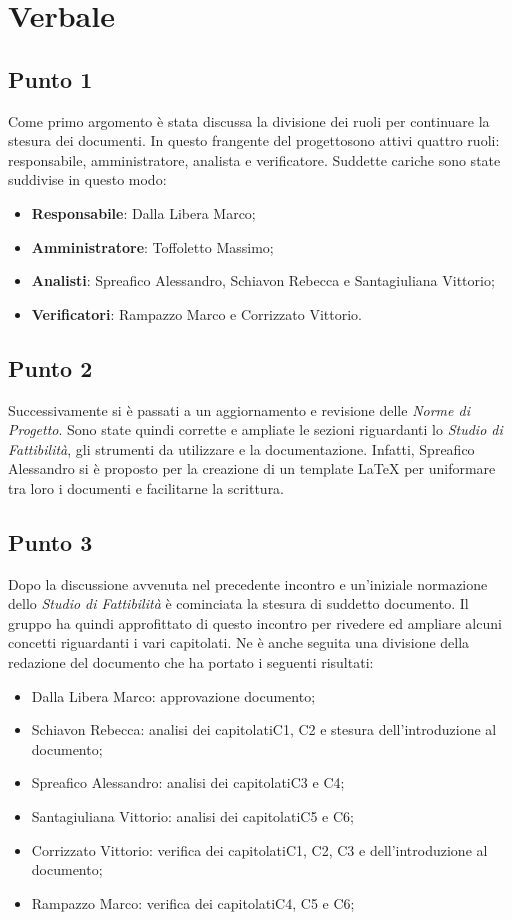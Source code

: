 \section{Verbale}
    \subsection{Punto 1}
        Come primo argomento è stata discussa la divisione dei ruoli per continuare la stesura dei documenti. In questo frangente del progetto\glosp sono attivi quattro ruoli: responsabile, amministratore, analista e verificatore. Suddette cariche sono state suddivise in questo modo:
        \begin{itemize}
            \item \textbf{Responsabile}: Dalla Libera Marco;
            \item \textbf{Amministratore}: Toffoletto Massimo;
            \item \textbf{Analisti}: Spreafico Alessandro, Schiavon Rebecca e Santagiuliana Vittorio;
            \item \textbf{Verificatori}: Rampazzo Marco e Corrizzato Vittorio. 
        \end{itemize}
    \subsection{Punto 2}
        Successivamente si è passati a un aggiornamento e revisione delle \textit{Norme di Progetto}. Sono state quindi corrette e ampliate le sezioni riguardanti lo \textit{Studio di Fattibilità}, gli strumenti da utilizzare e la documentazione. Infatti, Spreafico Alessandro si è proposto per la creazione di un template \LaTeX\xspace per uniformare tra loro i documenti e facilitarne la scrittura.
    \subsection{Punto 3}
        Dopo la discussione avvenuta nel precedente incontro e un'iniziale normazione dello \textit{Studio di Fattibilità} è cominciata la stesura di suddetto documento. Il gruppo ha quindi approfittato di questo incontro per rivedere ed ampliare alcuni concetti riguardanti i vari capitolati\glo. Ne è anche seguita una divisione della redazione del documento che ha portato i seguenti risultati:
        \begin{itemize}
            \item Dalla Libera Marco: approvazione documento;
            \item Schiavon Rebecca: analisi dei capitolati\glosp C1, C2 e stesura dell'introduzione al documento;
            \item Spreafico Alessandro: analisi dei capitolati\glosp C3 e C4;
            \item Santagiuliana Vittorio: analisi dei capitolati\glosp C5 e C6;
            \item Corrizzato Vittorio: verifica dei capitolati\glosp C1, C2, C3 e dell'introduzione al documento;
            \item Rampazzo Marco: verifica dei capitolati\glosp C4, C5 e C6;
        \end{itemize}
